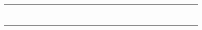 \documentclass{article}
\renewcommand\_{\textunderscore\allowbreak}
\newcommand{\tagmcend}{}
\begin{document}
\begin{table}
\begin{tabular}{p{4.5cm}*{26}{D}}
\anonstrut\textcolor{codelabel}{} & \X &  & \X & \X & \X & \X &  &  &  &  & \X & \X &  &  & \X &  & \X &  &  & \X &  &  &  &  &  &  \\
\anonstrut\textcolor{codelabel}{} & \X &  &  & \X &  &  &  &  &  & \X &  & \X &  &  &  &  & \X &  &  &  &  &  &  &  &  &  \\
\anonstrut\textcolor{codelabel}{} & \X &  &  &  & \X & \X &  &  &  & \X &  & \X & \X & \X & \X & \X & \X & \X &  &  &  &  &  &  & \X &  \\
\anonstrut\textcolor{codelabel}{} & \X &  &  & \X &  &  &  & \X & \X & \X &  &  & \X &  &  &  &  & \X &  &  &  &  &  &  &  &  \\
\citet{wesselkaemperOptimizationProcessingCosts2025} & \X &  & \X & \X & \X &  & \X &  & \X & \X &  & \X & \X &  &  &  &  & \X &  & \X & \X & \X &  &  & \X &  \\
\anonstrut\textcolor{codelabel}{} &  & \X & \X &  & \X &  & \X & \X & \X & \X &  & \X &  &  &  &  &  & \X &  & \X & \X & \X &  &  & \X &  \\
\anonstrut\textcolor{codelabel}{} & \X &  & \X & \X & \X & \X &  & \X &  & \X &  & \X &  &  &  &  & \X &  &  &  &  &  &  &  & \X &  \\
\anonstrut\textcolor{codelabel}{} & \X &  & \X & \X & \X & \X & \X & \X &  &  & \X & &  &  &  &  &  & \X &  &  &  &  &  &  & \X &  \\
\bottomrule
\end{tabular}
\end{table}
 \tagmcend
 
\end{document}
